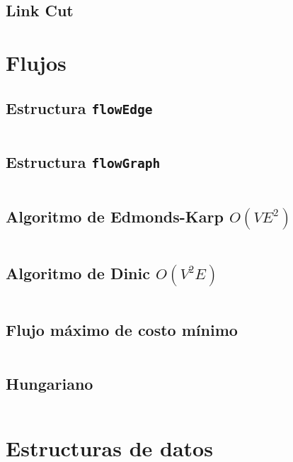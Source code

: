 \documentclass[11pt]{article}
\begin{document}
		\subsection{Link Cut}
		
		
	\newpage
	\section{Flujos}
		\subsection{Estructura \texttt{flowEdge}}
		\inputminted[tabsize=2,breaklines,firstline=4,lastline=17,fontsize=\small]{c++}{flow.cpp}
		
		\subsection{Estructura \texttt{flowGraph}}
		\inputminted[tabsize=2,breaklines,firstline=19,lastline=38,fontsize=\small]{c++}{flow.cpp}
		
		\subsection{Algoritmo de Edmonds-Karp $O(VE^2)$}
		\inputminted[tabsize=2,breaklines,firstline=82,lastline=108,fontsize=\small]{c++}{flow.cpp}
		
		\subsection{Algoritmo de Dinic $O(V^2E)$}
		\inputminted[tabsize=2,breaklines,firstline=40,lastline=80,fontsize=\small]{c++}{flow.cpp}
		
		\subsection{Flujo máximo de costo mínimo}
		\inputminted[tabsize=2,breaklines,firstline=110,lastline=145,fontsize=\small]{c++}{flow.cpp}
		
		\subsection{Hungariano}
		\inputminted[tabsize=2,breaklines,firstline=148,lastline=202,fontsize=\small]{c++}{flow.cpp}
		
	\newpage
	\section{Estructuras de datos}
\end{document}
